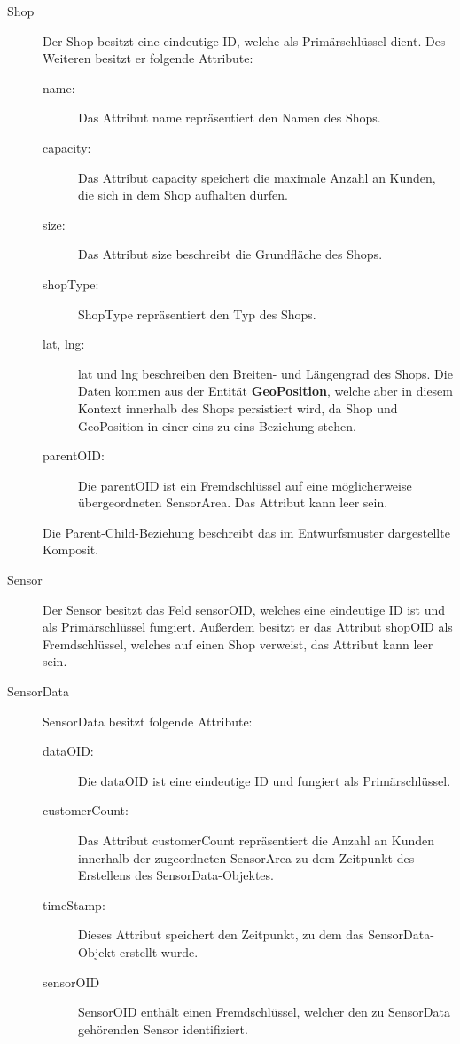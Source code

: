 \documentclass[runningheads]{llncs}
\begin{document}
\begin{description}
	\item[Shop] Der Shop besitzt eine eindeutige ID, welche als Primärschlüssel dient. 
	Des Weiteren besitzt er folgende Attribute: 
	\begin{description}
		\item [name:] Das Attribut name repräsentiert den Namen des Shops.
		\item [capacity:] Das Attribut capacity speichert die maximale Anzahl an Kunden, die sich in dem Shop aufhalten dürfen.
		\item [size:] Das Attribut size beschreibt die Grundfläche des Shops.
		\item [shopType:] ShopType repräsentiert den Typ des Shops.
		\item [lat, lng:] lat und lng beschreiben den Breiten- und Längengrad des Shops. Die Daten kommen aus der Entität \textbf{GeoPosition}, welche aber in diesem Kontext innerhalb des Shops persistiert wird, da Shop und GeoPosition in einer eins-zu-eins-Beziehung stehen.
		\item [parentOID:] Die parentOID ist ein Fremdschlüssel auf eine möglicherweise übergeordneten SensorArea. Das Attribut kann leer sein.
	\end{description} 
	Die Parent-Child-Beziehung beschreibt das im Entwurfsmuster dargestellte Komposit.
	\item[Sensor] Der Sensor besitzt das Feld sensorOID, welches eine eindeutige ID ist und als Primärschlüssel fungiert. Außerdem besitzt er das Attribut shopOID als Fremdschlüssel, welches auf einen Shop verweist, das Attribut kann leer sein.
	\item[SensorData] SensorData besitzt folgende Attribute:
	\begin{description}
		\item[dataOID:] Die dataOID ist eine eindeutige ID und fungiert als Primärschlüssel.
		\item[customerCount:] Das Attribut customerCount repräsentiert die Anzahl an Kunden innerhalb der zugeordneten SensorArea zu dem Zeitpunkt des Erstellens des SensorData-Objektes.
		\item[timeStamp:] Dieses Attribut speichert den Zeitpunkt, zu dem das SensorData-Objekt erstellt wurde.
		\item[sensorOID] SensorOID enthält einen Fremdschlüssel, welcher den zu SensorData gehörenden Sensor identifiziert.
	\end{description}
\end{description}
\end{document}
